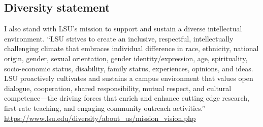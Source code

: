 \documentclass[11pt]{article}
\begin{document}
\subsection*{Diversity statement}
\footnotesize{I also stand with LSU's mission to support and sustain a diverse intellectual environment. ``LSU strives to create an inclusive, respectful, intellectually challenging climate that embraces individual difference in race, ethnicity, national origin, gender, sexual orientation, gender identity/expression, age, spirituality, socio-economic status, disability, family status, experiences, opinions, and ideas. LSU proactively cultivates and sustains a campus environment that values open dialogue, cooperation, shared responsibility, mutual respect, and cultural competence---the driving forces that enrich and enhance cutting edge research, first-rate teaching, and engaging community outreach activities.''
\url{https://www.lsu.edu/diversity/about\_us/mission\_vision.php}}

\end{document}
